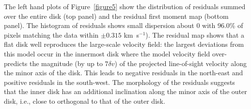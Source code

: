 \documentclass[onecolumn]{aastex6}
\newcommand{\kms}{km~s$^{-1}$}
\begin{document}
The left hand plots of Figure~\ref{figure5} show the distribution of residuals summed
over the entire disk (top panel) and the residual first moment map
(bottom panel).
The histogram of residuals shows small dispersion about 0 with 96.0\% of pixels
matching the data within $\pm0.315$ \kms).
The residual map shows that a flat disk well reproduces the large-scale
velocity field: the largest deviations from this model occur in the innermost
disk where the model velocity field over-predicts the magnitude (by up to $7\delta v$) of the
projected line-of-sight velocity along the minor axis of the disk.
This leads to negative residuals in the north-east
and positive residuals in the south-west.
The morphology of the residuals suggests that the inner disk has an
additional inclination along the minor axis of the outer disk, i.e.,
close to orthogonal to that of the outer disk.

%
\end{document}
